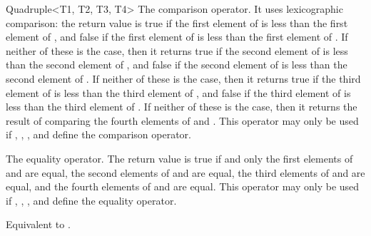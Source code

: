 \begin{ccRefClass}{Quadruple<T1, T2, T3, T4>}
   {The comparison operator. It uses lexicographic comparison:
    the return value is true if the first element of  is less
    than the first element of , and false if the first element
    of  is less than the first element of . If neither
    of these is the case, then it returns true if the second element
    of  is less than the second element of , and false
    if the second element of  is less than the second element
    of . If neither of these is the case, then it returns true
    if the third element of  is less than the third element of
    , and false if the third element of  is less than
    the third element of .  If neither of these is the case,
    then it returns the result of comparing the fourth elements of
     and . This operator may only be used if ,
    , , and  define the comparison operator.}
  
   {The equality operator. The return value is true if and only
    the first elements of  and  are equal, the second
    elements of  and  are equal, the third elements of
     and  are equal, and the fourth elements of 
    and  are equal.  This operator may only be used if
    , , , and  define the equality
    operator.}
  
  {Equivalent to .}

\end{ccRefClass}


\ccParDims



